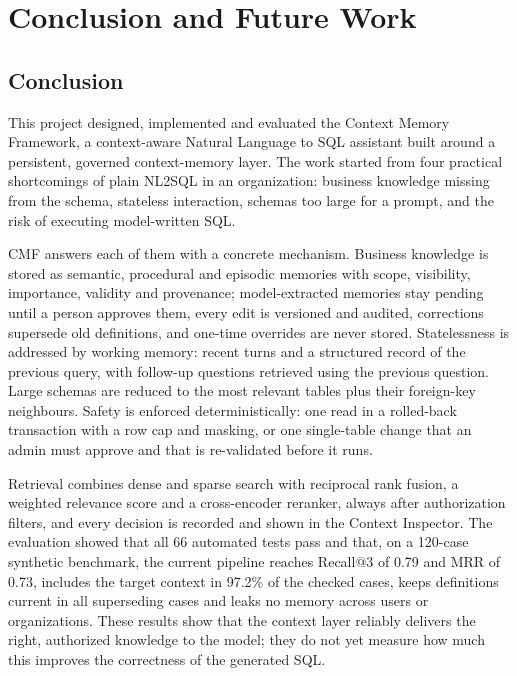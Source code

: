 \chapter{Conclusion and Future Work}

\section{Conclusion}
This project designed, implemented and evaluated the Context Memory Framework, a
context-aware Natural Language to SQL assistant built around a persistent, governed
context-memory layer. The work started from four practical shortcomings of plain NL2SQL in
an organization: business knowledge missing from the schema, stateless interaction, schemas
too large for a prompt, and the risk of executing model-written SQL.

CMF answers each of them with a concrete mechanism. Business knowledge is stored as
semantic, procedural and episodic memories with scope, visibility, importance, validity and
provenance; model-extracted memories stay pending until a person approves them, every edit
is versioned and audited, corrections supersede old definitions, and one-time overrides are
never stored. Statelessness is addressed by working memory: recent turns and a structured
record of the previous query, with follow-up questions retrieved using the previous
question. Large schemas are reduced to the most relevant tables plus their foreign-key
neighbours. Safety is enforced deterministically: one read in a rolled-back transaction with
a row cap and masking, or one single-table change that an admin must approve and that is
re-validated before it runs.

Retrieval combines dense and sparse search with reciprocal rank fusion, a weighted
relevance score and a cross-encoder reranker, always after authorization filters, and every
decision is recorded and shown in the Context Inspector. The evaluation showed that all 66
automated tests pass and that, on a 120-case synthetic benchmark, the current pipeline
reaches Recall@3 of 0.79 and MRR of 0.73, includes the target context in 97.2\% of the
checked cases, keeps definitions current in all superseding cases and leaks no memory
across users or organizations. These results show that the context layer reliably delivers
the right, authorized knowledge to the model; they do not yet measure how much this
improves the correctness of the generated SQL.

